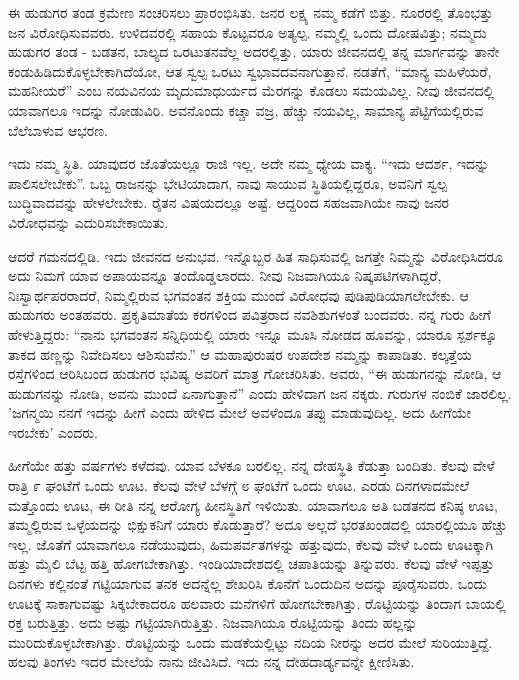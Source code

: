 ಈ ಹುಡುಗರ ತಂಡ ಕ್ರಮೇಣ ಸಂಚರಿಸಲು ಪ್ರಾರಂಭಿಸಿತು. ಜನರ ಲಕ್ಷ್ಯ ನಮ್ಮ ಕಡೆಗೆ ಬಿತ್ತು. ನೂರರಲ್ಲಿ ತೊಂಭತ್ತು ಜನ ವಿರೋಧಿಸುವವರು. ಉಳಿದವರಲ್ಲಿ ಸಹಾಯ ಕೊಟ್ಟವರೂ ಅತ್ಯಲ್ಪ. ನಮ್ಮಲ್ಲಿ ಒಂದು ದೋಷವಿತ್ತು; ನಮ್ಮದು ಹುಡುಗರ ತಂಡ - ಬಡತನ, ಬಾಲ್ಯದ ಒರಟುತನವೆಲ್ಲ ಅದರಲ್ಲಿತ್ತು. ಯಾರು ಜೀವನದಲ್ಲಿ ತನ್ನ ಮಾರ್ಗವನ್ನು ತಾನೇ ಕಂಡುಹಿಡಿದುಕೊಳ್ಳಬೇಕಾಗಿದೆಯೋ, ಆತ ಸ್ವಲ್ಪ ಒರಟು ಸ್ವಭಾವದವನಾಗುತ್ತಾನೆ. ನಡತೆಗೆ, “ಮಾನ್ಯ ಮಹಿಳೆಯರೆ, ಮಹನೀಯರೆ” ಎಂಬ ನಯವಿನಯ ಮೃದುಮಾಧುರ್ಯದ ಮೆರಗನ್ನು ಕೊಡಲು ಸಮಯವಿಲ್ಲ. ನೀವು ಜೀವನದಲ್ಲಿ ಯಾವಾಗಲೂ ಇದನ್ನು ನೋಡುವಿರಿ. ಅವನೊಂದು ಕಚ್ಚಾ ವಜ್ರ, ಹೆಚ್ಚು ನಯವಿಲ್ಲ, ಸಾಮಾನ್ಯ ಪೆಟ್ಟಿಗೆಯಲ್ಲಿರುವ ಬೆಲೆಬಾಳುವ ಆಭರಣ.

ಇದು ನಮ್ಮ ಸ್ಥಿತಿ. ಯಾವುದರ ಜೊತೆಯಲ್ಲೂ ರಾಜಿ ಇಲ್ಲ. ಅದೇ ನಮ್ಮ ಧ್ಯೇಯ ವಾಕ್ಯ. “ಇದು ಆದರ್ಶ, ಇದನ್ನು ಪಾಲಿಸಲೇಬೇಕು”. ಒಬ್ಬ ರಾಜನನ್ನು ಭೇಟಿಯಾದಾಗ, ನಾವು ಸಾಯುವ ಸ್ಥಿತಿಯಲ್ಲಿದ್ದರೂ, ಅವನಿಗೆ ಸ್ವಲ್ಪ ಬುದ್ಧಿವಾದವನ್ನು ಹೇಳಲೇಬೇಕು. ರೈತನ ವಿಷಯದಲ್ಲೂ ಅಷ್ಟೆ. ಆದ್ದರಿಂದ ಸಹಜವಾಗಿಯೇ ನಾವು ಜನರ ವಿರೋಧವನ್ನು ಎದುರಿಸಬೇಕಾಯಿತು.

ಆದರೆ ಗಮನದಲ್ಲಿಡಿ. ಇದು ಜೀವನದ ಅನುಭವ. ಇನ್ನೊಬ್ಬರ ಹಿತ ಸಾಧಿಸುವಲ್ಲಿ ಜಗತ್ತೇ ನಿಮ್ಮನ್ನು ವಿರೋಧಿಸಿದರೂ ಅದು ನಿಮಗೆ ಯಾವ ಅಪಾಯವನ್ನೂ ತಂದೊಡ್ಡಲಾರದು. ನೀವು ನಿಜವಾಗಿಯೂ ನಿಷ್ಕಪಟಿಗಳಾಗಿದ್ದರೆ, ನಿಃಸ್ವಾರ್ಥಪರರಾದರೆ, ನಿಮ್ಮಲ್ಲಿರುವ ಭಗವಂತನ ಶಕ್ತಿಯ ಮುಂದೆ ವಿರೋಧವು ಪುಡಿಪುಡಿಯಾಗಲೇಬೇಕು. ಆ ಹುಡುಗರು ಅಂತಹವರು. ಪ್ರಕೃತಿಮಾತೆಯ ಕರಗಳಿಂದ ಪವಿತ್ರರಾದ ನವಶಿಶುಗಳಂತೆ ಬಂದವರು. ನನ್ನ ಗುರು ಹೀಗೆ ಹೇಳುತ್ತಿದ್ದರು: “ನಾನು ಭಗವಂತನ ಸನ್ನಿಧಿಯಲ್ಲಿ ಯಾರು ಇನ್ನೂ ಮೂಸಿ ನೋಡದ ಹೂವನ್ನು, ಯಾರೂ ಸ್ಪರ್ಶಕ್ಕೂ ತಾಕದ ಹಣ್ಣನ್ನು ನಿವೇದಿಸಲು ಆಶಿಸುವೆನು.” ಆ ಮಹಾಪುರುಷರ ಉಪದೇಶ ನಮ್ಮನ್ನು ಕಾಪಾಡಿತು. ಕಲ್ಕತ್ತೆಯ ರಸ್ತೆಗಳಿಂದ ಆರಿಸಿಬಂದ ಹುಡುಗರ ಭವಿಷ್ಯ ಅವರಿಗೆ ಮಾತ್ರ ಗೋಚರಿಸಿತು. ಅವರು, “ಈ ಹುಡುಗನನ್ನು ನೋಡಿ, ಆ ಹುಡುಗನನ್ನು ನೋಡಿ, ಅವನು ಮುಂದೆ ಏನಾಗುತ್ತಾನೆ” ಎಂದು ಹೇಳಿದಾಗ ಜನ ನಕ್ಕರು. ಗುರುಗಳ ನಂಬಿಕೆ ಜಾರಲಿಲ್ಲ. 'ಜಗನ್ಮಯಿ ನನಗೆ ಇದನ್ನು ಹೀಗೆ ಎಂದು ಹೇಳಿದ ಮೇಲೆ ಅವಳೆಂದೂ ತಪ್ಪು ಮಾಡುವುದಿಲ್ಲ. ಅದು ಹೀಗೆಯೇ ಇರಬೇಕು' ಎಂದರು.

ಹೀಗೆಯೇ ಹತ್ತು ವರ್ಷಗಳು ಕಳೆದವು. ಯಾವ ಬೆಳಕೂ ಬರಲಿಲ್ಲ. ನನ್ನ ದೇಹಸ್ಥಿತಿ ಕೆಡುತ್ತಾ ಬಂದಿತು. ಕೆಲವು ವೇಳೆ ರಾತ್ರಿ ೯ ಘಂಟೆಗೆ ಒಂದು ಊಟ. ಕೆಲವು ವೇಳೆ ಬೆಳಗ್ಗೆ ೮ ಘಂಟೆಗೆ ಒಂದು ಊಟ. ಎರಡು ದಿನಗಳಾದಮೇಲೆ ಮತ್ತೊಂದು ಊಟ, ಈ ರೀತಿ ನನ್ನ ಆರೋಗ್ಯ ಹೀನಸ್ಥಿತಿಗೆ ಇಳಿಯಿತು. ಯಾವಾಗಲೂ ಅತಿ ಬಡತನದ ಕನಿಷ್ಠ ಊಟ, ತಮ್ಮಲ್ಲಿರುವ ಒಳ್ಳೆಯದನ್ನು ಭಿಕ್ಷುಕನಿಗೆ ಯಾರು ಕೊಡುತ್ತಾರೆ? ಅದೂ ಅಲ್ಲದೆ ಭರತಖಂಡದಲ್ಲಿ ಯಾರಲ್ಲಿಯೂ ಹೆಚ್ಚು ಇಲ್ಲ. ಜೊತೆಗೆ ಯಾವಾಗಲೂ ನಡೆಯುವುದು, ಹಿಮಪರ್ವತಗಳನ್ನು ಹತ್ತುವುದು, ಕೆಲವು ವೇಳೆ ಒಂದು ಊಟಕ್ಕಾಗಿ ಹತ್ತು ಮೈಲಿ ಬೆಟ್ಟ ಹತ್ತಿ ಹೋಗಬೇಕಾಗಿತ್ತು. ಇಂಡಿಯಾದೇಶದಲ್ಲಿ ಚಪಾತಿಯನ್ನು ತಿನ್ನುವರು. ಕೆಲವು ವೇಳೆ ಇಪ್ಪತ್ತು ದಿನಗಳು ಕಲ್ಲಿನಂತೆ ಗಟ್ಟಿಯಾಗುವ ತನಕ ಅದನ್ನೆಲ್ಲ ಶೇಖರಿಸಿ ಕೊನೆಗೆ ಒಂದುದಿನ ಅದನ್ನು ಪೂರೈಸುವರು. ಒಂದು ಊಟಕ್ಕೆ ಸಾಕಾಗುವಷ್ಟು ಸಿಕ್ಕಬೇಕಾದರೂ ಹಲವಾರು ಮನೆಗಳಿಗೆ ಹೋಗಬೇಕಾಗಿತ್ತು. ರೊಟ್ಟಿಯನ್ನು ತಿಂದಾಗ ಬಾಯಲ್ಲಿ ರಕ್ತ ಬರುತ್ತಿತ್ತು. ಅದು ಅಷ್ಟು ಗಟ್ಟಿಯಾಗಿರುತ್ತಿತ್ತು. ನಿಜವಾಗಿಯೂ ರೊಟ್ಟಿಯನ್ನು ತಿಂದು ಹಲ್ಲನ್ನು ಮುರಿದುಕೊಳ್ಳಬೇಕಾಗಿತ್ತು. ರೊಟ್ಟಿಯನ್ನು ಒಂದು ಮಡಕೆಯಲ್ಲಿಟ್ಟು ನದಿಯ ನೀರನ್ನು ಅದರ ಮೇಲೆ ಸುರಿಯುತ್ತಿದ್ದೆ. ಹಲವು ತಿಂಗಳು ಇದರ ಮೇಲೆಯೆ ನಾನು ಜೀವಿಸಿದೆ. ಇದು ನನ್ನ ದೇಹದಾರ್ಡ್ಯವನ್ನೇ ಕ್ಷೀಣಿಸಿತು.

